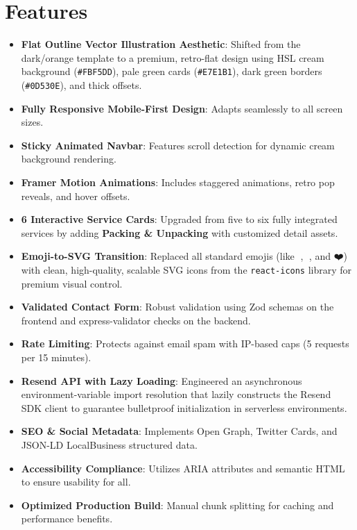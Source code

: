 \documentclass[11pt,a4paper]{article}
\begin{document}
\section{Features}
\begin{itemize}
    \item \textbf{Flat Outline Vector Illustration Aesthetic}: Shifted from the dark/orange template to a premium, retro-flat design using HSL cream background (\texttt{\#FBF5DD}), pale green cards (\texttt{\#E7E1B1}), dark green borders (\texttt{\#0D530E}), and thick offsets.
    \item \textbf{Fully Responsive Mobile-First Design}: Adapts seamlessly to all screen sizes.
    \item \textbf{Sticky Animated Navbar}: Features scroll detection for dynamic cream background rendering.
    \item \textbf{Framer Motion Animations}: Includes staggered animations, retro pop reveals, and hover offsets.
    \item \textbf{6 Interactive Service Cards}: Upgraded from five to six fully integrated services by adding \textbf{Packing \& Unpacking} with customized detail assets.
    \item \textbf{Emoji-to-SVG Transition}: Replaced all standard emojis (like 🎉, 🚚, and ❤️) with clean, high-quality, scalable SVG icons from the \texttt{react-icons} library for premium visual control.
    \item \textbf{Validated Contact Form}: Robust validation using Zod schemas on the frontend and express-validator checks on the backend.
    \item \textbf{Rate Limiting}: Protects against email spam with IP-based caps (5 requests per 15 minutes).
    \item \textbf{Resend API with Lazy Loading}: Engineered an asynchronous environment-variable import resolution that lazily constructs the Resend SDK client to guarantee bulletproof initialization in serverless environments.
    \item \textbf{SEO \& Social Metadata}: Implements Open Graph, Twitter Cards, and JSON-LD LocalBusiness structured data.
    \item \textbf{Accessibility Compliance}: Utilizes ARIA attributes and semantic HTML to ensure usability for all.
    \item \textbf{Optimized Production Build}: Manual chunk splitting for caching and performance benefits.
\end{itemize}
\end{document}
